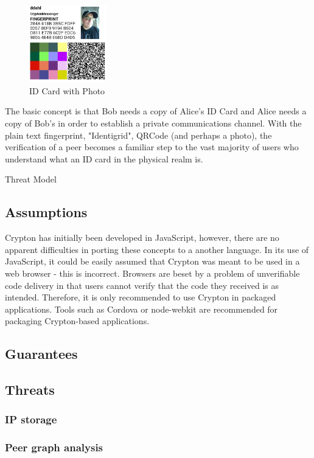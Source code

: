 \documentclass[conference]{IEEEtran}
\begin{document}
\begin{figure}[h]
  \centering
  \includegraphics[width=0.3\textwidth]{id-card-example.png}
  \caption{ID Card with Photo}
\end{figure}

The basic concept is that Bob needs a copy of Alice's ID Card and Alice needs a copy of Bob's in order to establish a private communications channel. With the plain text fingerprint, "Identigrid", QRCode (and perhaps a photo), the verification of a peer becomes a familiar step to the vast majority of users who understand what an ID card in the physical realm is. 

{Threat Model}
\subsection{Assumptions}
Crypton has initially been developed in JavaScript, however, there are no
apparent difficulties in porting these concepts to a another language.
In its use of JavaScript, it could be easily assumed that Crypton was meant to
be used in a web browser - this is incorrect. Browsers are beset by a problem of
unverifiable code delivery in that users cannot verify that
the code they received is as intended. Therefore, it is only recommended to use
Crypton in packaged applications. Tools such as Cordova or node-webkit are
recommended for packaging Crypton-based applications.

\subsection{Guarantees}

\subsection{Threats}

\subsubsection{IP storage}
\subsubsection{Peer graph analysis}
\end{document}
